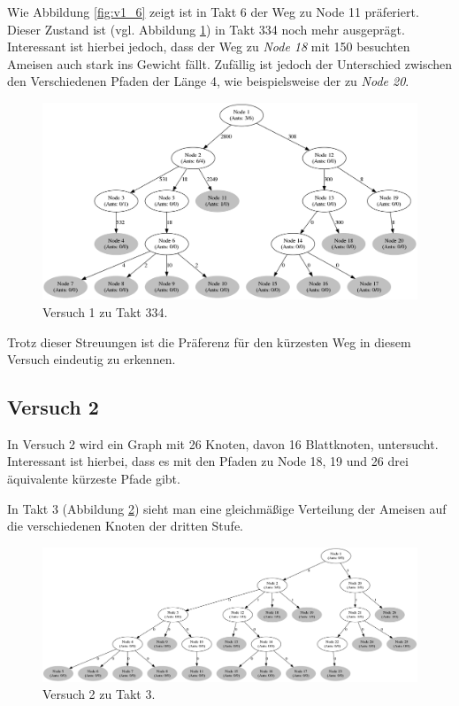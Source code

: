 Wie Abbildung \ref{fig:v1_6} zeigt ist in Takt 6 der Weg zu Node 11 präferiert.
Dieser Zustand ist (vgl. Abbildung \ref{fig:v1_334}) in Takt 334 noch mehr ausgeprägt. Interessant ist hierbei jedoch, dass der Weg zu \emph{Node 18} mit 150 besuchten Ameisen auch stark ins Gewicht fällt. Zufällig ist jedoch der Unterschied zwischen den Verschiedenen Pfaden der Länge 4, wie beispielsweise der zu \emph{Node 20}.
\begin{figure}[htbp]
	\includegraphics[width=.9\textwidth]{images/v1_334.png}
	\caption{Versuch 1 zu Takt 334.}
	\label{fig:v1_334}
\end{figure}
Trotz dieser Streuungen ist die Präferenz für den kürzesten Weg in diesem Versuch eindeutig zu erkennen.

\subsection{Versuch 2}
In Versuch 2 wird ein Graph mit 26 Knoten, davon 16 Blattknoten, untersucht.
Interessant ist hierbei, dass es mit den Pfaden zu Node 18, 19 und 26 drei äquivalente kürzeste Pfade gibt.\par
In Takt 3 (Abbildung \ref{fig:v2_3}) sieht man eine gleichmäßige Verteilung der Ameisen auf die verschiedenen Knoten der dritten Stufe.

\begin{figure}[htbp]
	\includegraphics[width=.9\textwidth]{images/v2_3.png}
	\caption{Versuch 2 zu Takt 3.}
	\label{fig:v2_3}
\end{figure}

